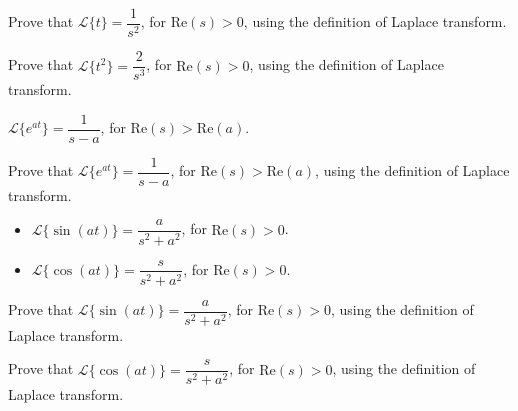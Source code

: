\documentclass[12pt, a4paper]{article}
\begin{document}
\clearpage

\begin{problem}
	Prove that $\mathcal{L}\{t\} = \dfrac{1}{s^2}$, for $\text{Re}(s) > 0$, using the definition of Laplace transform. 
\end{problem}

\clearpage

\begin{problem}
	Prove that $\mathcal{L}\{t^2\} = \dfrac{2}{s^3}$, for $\text{Re}(s) > 0$, using the definition of Laplace transform. 
\end{problem}

\clearpage


\begin{definition}
	$\mathcal{L}\{e^{at}\} = \dfrac{1}{s - a}$, for $\text{Re}(s) > \text{Re}(a)$.
\end{definition}

\vspace{10pt}

\begin{problem}
	Prove that $\mathcal{L}\{e^{at}\} = \dfrac{1}{s - a}$, for $\text{Re}(s) > \text{Re}(a)$, using the definition of Laplace transform. 
\end{problem}

\clearpage

\clearpage

\begin{definition}
	\begin{itemize}
		\item $\mathcal{L}\{\sin(at)\} = \dfrac{a}{s^2 + a^2}$, for $\text{Re}(s) > 0$.
		\item $\mathcal{L}\{\cos(at)\} = \dfrac{s}{s^2 + a^2}$, for $\text{Re}(s) > 0$.
	\end{itemize}
\end{definition}

\vspace{20pt}

\begin{problem}
	Prove that $\mathcal{L}\{\sin(at)\} = \dfrac{a}{s^2 + a^2}$, for $\text{Re}(s) > 0$, using the definition of Laplace transform.
\end{problem}

\clearpage

\begin{problem}
	Prove that $\mathcal{L}\{\cos(at)\} = \dfrac{s}{s^2 + a^2}$, for $\text{Re}(s) > 0$, using the definition of Laplace transform.
\end{problem}
\end{document}
